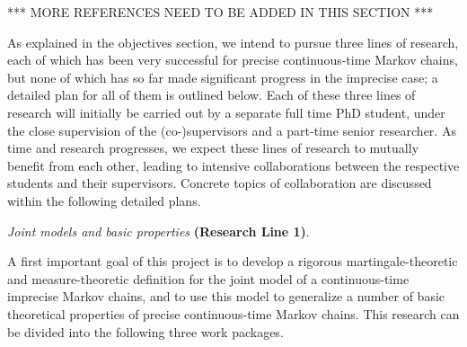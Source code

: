 \documentclass[11pt,dvipsnames,usenames,a4paper]{article}
\begin{document}
*** MORE REFERENCES NEED TO BE ADDED IN THIS SECTION ***

As explained in the objectives section, we intend to pursue three lines of research, each of which has been very successful for precise continuous-time Markov chains, but none of which has so far made significant progress in the imprecise case; a detailed plan for all of them is outlined below. Each of these three lines of research will initially be carried out by a separate full time PhD student, under the close supervision of the (co-)supervisors and a part-time senior researcher. As time and research progresses, we expect these lines of research to mutually benefit from each other, leading to intensive collaborations between the respective students and their supervisors. Concrete topics of collaboration are discussed within the following detailed plans.



\vspace{5pt}
\emph{Joint models and basic properties} {\bf (Research Line 1)}.
\vspace{3pt}

A first important goal of this project is to develop a rigorous martingale-theoretic and measure-theoretic definition for the joint model of a continuous-time imprecise Markov chains, and to use this model to generalize a number of basic theoretical properties of precise continuous-time Markov chains. %
This research can be divided into the following three work packages.
\end{document}
